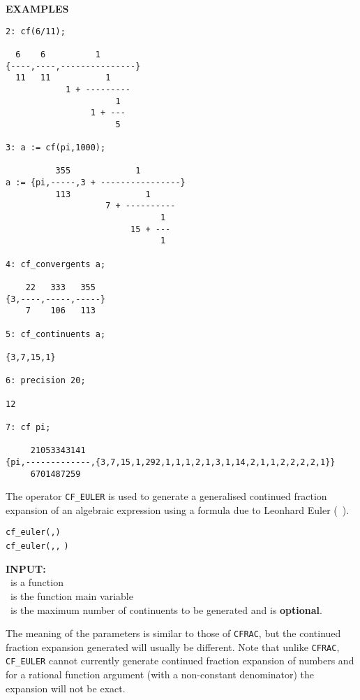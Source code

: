 \large{\textbf{EXAMPLES}}
\begin{verbatim}
2: cf(6/11);

  6    6          1
{----,----,---------------}
  11   11           1
            1 + ---------
                      1
                 1 + ---
                      5

3: a := cf(pi,1000);

          355             1
a := {pi,-----,3 + ----------------}
          113               1
                    7 + ----------
                               1
                         15 + ---
                               1

4: cf_convergents a;

    22   333   355
{3,----,-----,-----}
    7    106   113

5: cf_continuents a;

{3,7,15,1}

6: precision 20;

12

7: cf pi;

     21053343141
{pi,-------------,{3,7,15,1,292,1,1,1,2,1,3,1,14,2,1,1,2,2,2,2,1}}
     6701487259
\end{verbatim}

\hypertarget{CF_EULER:operator}{}
The operator \texttt{CF\_EULER} is used to generate a generalised
continued fraction expansion of an algebraic expression using a formula due to
Leonhard Euler (~\cite{LE}).
\begin{syntaxtable}
 \texttt{cf\_euler(}\texttt{,}\texttt{)}\\
 \texttt{cf\_euler(}\texttt{,}\texttt{,}
  \texttt{)}
\end{syntaxtable}


\textbf{INPUT:}\\
\ is a function\\
 \ is the function main variable\\
 \ is the maximum number of continuents to be generated
and is \textbf{optional}.

The meaning of the parameters is similar to those of \texttt{CFRAC}, but the
continued fraction expansion generated will usually be different. Note that
unlike \texttt{CFRAC}, \texttt{CF\_EULER} cannot currently generate
continued fraction expansion of numbers and for a rational function argument
(with a non-constant denominator) the expansion will not be exact.

